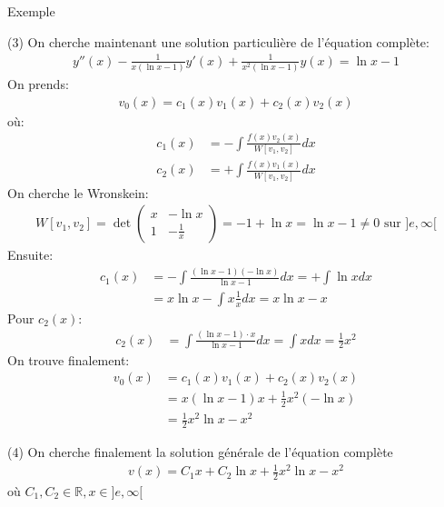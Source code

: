 \begin{parag}{Exemple}
   \begin{subparag}{(3)}
       On cherche maintenant une solution particulière de l'équation complète:
       \begin{align*}
           y''(x) - \frac{1}{x(\ln x - 1)}y'(x) + \frac{1}{x^2(\ln x -1)} y(x) = \ln x - 1
       \end{align*}
       On prends:
       \begin{align*}
           v_0 ( x) = c_1(x)v_1(x) + c_2(x)v_2(x) 
       \end{align*}
       où:
       \begin{align*}
           c_1(x) &= -\int \frac{f(x)v_2(x)}{W[v_1, v_2]}dx \\
           c_2(x) &= +\int \frac{f(x) v_1(x)}{W[v_1, v_2]}dx
       \end{align*}
       On cherche le Wronskein:
       \begin{align*}
           W[v_1, v_2] = \det \begin{pmatrix}
               x & - \ln x \\
               1 & - \frac{1}{x}
           \end{pmatrix} = -1 + \ln x = \ln x - 1 \neq 0 \text{ sur } ]e, \infty[
       \end{align*}
       Ensuite:
       \begin{align*}
           c_1(x) &= -\int \frac{(\ln x - 1)(-\ln x)}{\ln x - 1}dx = + \int \ln x dx\\ &= x \ln x - \int x \frac{1}{x} dx = x \ln x - x
       \end{align*}
       Pour $c_2(x)$:
       \begin{align*}
           c_2(x) &= \int \frac{(\ln x -1) \cdot x}{\ln x - 1} dx = \int x dx = \frac{1}{2}x^2
       \end{align*}
       On trouve finalement:
       \begin{align*}
           v_0(x) &= c_1(x)v_1(x) + c_2(x)v_2(x)\\ &= x(\ln x - 1)x + \frac{1}{2}x^2 (-\ln x)\\ &= \frac{1}{2}x^2 \ln x - x^2
       \end{align*}
   \end{subparag} 
   \begin{subparag}{(4)}
       On cherche finalement la solution générale de l'équation complète
       \begin{align*}
           v(x) = C_1x + C_2 \ln x + \frac{1}{2}x^2 \ln x - x^2
       \end{align*}
       où $C_1, C_2 \in \mathbb{R}, x \in ] e, \infty[$
       
       
   \end{subparag}
\end{parag}



